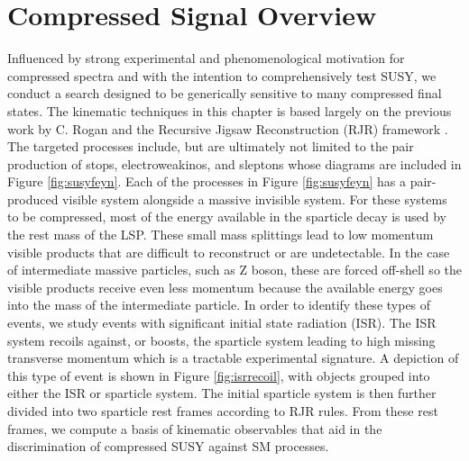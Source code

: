\section{Compressed Signal Overview}
Influenced by strong experimental and phenomenological motivation for compressed spectra and with the intention to comprehensively test SUSY, we conduct a search designed to be generically sensitive to many compressed final states. The kinematic techniques in this chapter is based largely on the previous work by C. Rogan and the Recursive Jigsaw Reconstruction (RJR) framework \cite{AN}\cite{PhysRevD.96.112007}. The targeted processes include, but are ultimately not limited to the pair production of stops, electroweakinos, and sleptons whose diagrams are included in Figure \ref{fig:susyfeyn}.  
Each of the processes in Figure \ref{fig:susyfeyn} has a pair-produced visible system alongside a massive invisible system. For these systems to be compressed, most of the energy available in the sparticle decay is used by the rest mass of the LSP. These small mass splittings lead to low momentum visible products that are difficult to reconstruct or are undetectable. In the case of intermediate massive particles, such as Z boson, these are forced off-shell so the visible products receive even less momentum because the available energy goes into the mass of the intermediate particle. In order to identify these types of events, we study events with significant initial state radiation (ISR). The ISR system recoils against, or boosts, the sparticle system leading to high missing transverse momentum which is a tractable experimental signature. A depiction of this type of event is shown in Figure \ref{fig:isrrecoil}, with objects grouped into either the ISR or sparticle system. The initial sparticle system is then further divided into two sparticle rest frames according to RJR rules. From these rest frames, we compute a basis of kinematic observables that aid in the discrimination of compressed SUSY against SM processes.

